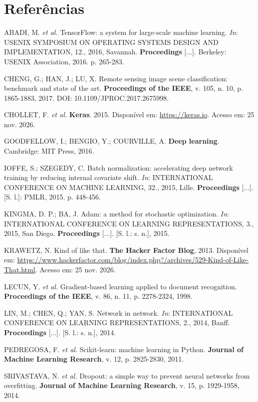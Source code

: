 \documentclass[12pt,a4paper]{article}
\begin{document}
\section*{Referências}
{\small\setlength{\parindent}{0pt}\setlength{\parskip}{6pt}\raggedright
ABADI, M. \textit{et al.} TensorFlow: a system for large-scale machine learning. \textit{In}: USENIX SYMPOSIUM ON OPERATING SYSTEMS DESIGN AND IMPLEMENTATION, 12., 2016, Savannah. \textbf{Proceedings} [...]. Berkeley: USENIX Association, 2016. p. 265-283.

CHENG, G.; HAN, J.; LU, X. Remote sensing image scene classification: benchmark and state of the art. \textbf{Proceedings of the IEEE}, v. 105, n. 10, p. 1865-1883, 2017. DOI: 10.1109/JPROC.2017.2675998.

CHOLLET, F. \textit{et al.} \textbf{Keras}. 2015. Disponível em: \url{https://keras.io}. Acesso em: 25 nov. 2026.

GOODFELLOW, I.; BENGIO, Y.; COURVILLE, A. \textbf{Deep learning}. Cambridge: MIT Press, 2016.

IOFFE, S.; SZEGEDY, C. Batch normalization: accelerating deep network training by reducing internal covariate shift. \textit{In}: INTERNATIONAL CONFERENCE ON MACHINE LEARNING, 32., 2015, Lille. \textbf{Proceedings} [...]. [S. l.]: PMLR, 2015. p. 448-456.

KINGMA, D. P.; BA, J. Adam: a method for stochastic optimization. \textit{In}: INTERNATIONAL CONFERENCE ON LEARNING REPRESENTATIONS, 3., 2015, San Diego. \textbf{Proceedings} [...]. [S. l.: s. n.], 2015.

KRAWETZ, N. Kind of like that. \textbf{The Hacker Factor Blog}, 2013. Disponível em: \url{https://www.hackerfactor.com/blog/index.php?/archives/529-Kind-of-Like-That.html}. Acesso em: 25 nov. 2026.

LECUN, Y. \textit{et al.} Gradient-based learning applied to document recognition. \textbf{Proceedings of the IEEE}, v. 86, n. 11, p. 2278-2324, 1998.

LIN, M.; CHEN, Q.; YAN, S. Network in network. \textit{In}: INTERNATIONAL CONFERENCE ON LEARNING REPRESENTATIONS, 2., 2014, Banff. \textbf{Proceedings} [...]. [S. l.: s. n.], 2014.

PEDREGOSA, F. \textit{et al.} Scikit-learn: machine learning in Python. \textbf{Journal of Machine Learning Research}, v. 12, p. 2825-2830, 2011.

SRIVASTAVA, N. \textit{et al.} Dropout: a simple way to prevent neural networks from overfitting. \textbf{Journal of Machine Learning Research}, v. 15, p. 1929-1958, 2014.\par}
\end{document}
